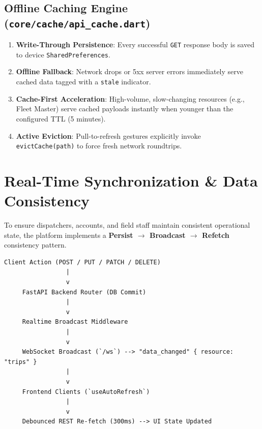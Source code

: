 \documentclass[11pt,a4paper]{article}
\begin{document}
\subsection{Offline Caching Engine (\texttt{core/cache/api\_cache.dart})}
\begin{enumerate}[leftmargin=1.4em,itemsep=3pt]
  \item \textbf{Write-Through Persistence}: Every successful \texttt{GET} response body is saved to device \texttt{SharedPreferences}.
  \item \textbf{Offline Fallback}: Network drops or 5xx server errors immediately serve cached data tagged with a \texttt{stale} indicator.
  \item \textbf{Cache-First Acceleration}: High-volume, slow-changing resources (e.g., Fleet Master) serve cached payloads instantly when younger than the configured TTL (5 minutes).
  \item \textbf{Active Eviction}: Pull-to-refresh gestures explicitly invoke \texttt{evictCache(path)} to force fresh network roundtrips.
\end{enumerate}

\section{Real-Time Synchronization \& Data Consistency}

To ensure dispatchers, accounts, and field staff maintain consistent operational state, the platform implements a \textbf{Persist $\rightarrow$ Broadcast $\rightarrow$ Refetch} consistency pattern.

\begin{lstlisting}[style=asciiart]
Client Action (POST / PUT / PATCH / DELETE)
                 |
                 v
     FastAPI Backend Router (DB Commit)
                 |
                 v
     Realtime Broadcast Middleware
                 |
                 v
     WebSocket Broadcast (`/ws`) --> "data_changed" { resource: "trips" }
                 |
                 v
     Frontend Clients (`useAutoRefresh`)
                 |
                 v
     Debounced REST Re-fetch (300ms) --> UI State Updated
\end{lstlisting}
\end{document}
